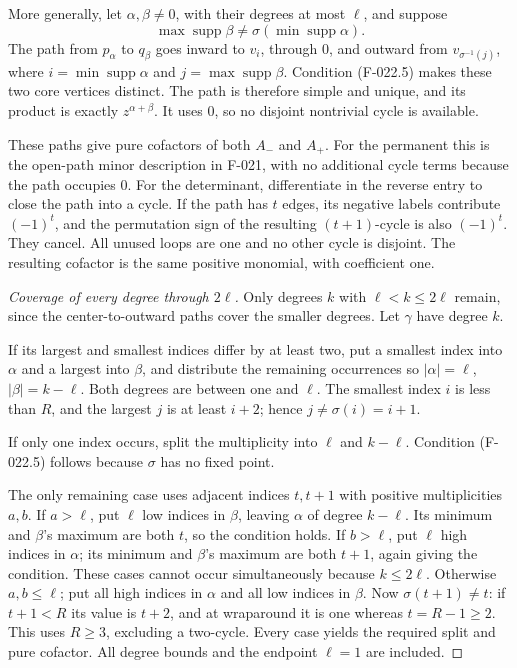More generally, let \(\alpha,\beta\ne0\), with their
degrees at most \(\ell\), and suppose
\[
        \max\operatorname{supp}\beta
                      \ne\sigma(\min\operatorname{supp}\alpha).
                                                               \tag{F-022.5}
\]
The path from \(p_\alpha\) to \(q_\beta\) goes
inward to \(v_i\), through \(0\), and outward from
\(v_{\sigma^{-1}(j)}\), where
\(i=\min\operatorname{supp}\alpha\) and
\(j=\max\operatorname{supp}\beta\).
Condition (F-022.5) makes these two core vertices distinct.
The path is therefore simple and unique, and its product
is exactly \(z^{\alpha+\beta}\). It uses \(0\),
so no disjoint nontrivial cycle is available.

These paths give pure cofactors of both \(A_-\) and
\(A_+\). For the permanent this is the open-path minor
description in F-021, with no additional cycle terms because
the path occupies \(0\). For the determinant, differentiate
in the reverse entry to close the path into a cycle. If
the path has \(t\) edges, its negative labels contribute
\((-1)^t\), and the permutation sign of the resulting
\((t+1)\)-cycle is also \((-1)^t\). They cancel.
All unused loops are one and no other cycle is disjoint.
The resulting cofactor is the same positive monomial,
with coefficient one.

\begin{proof}[Coverage of every degree through \(2\ell\)]
Only degrees \(k\) with \(\ell<k\leq2\ell\) remain,
since the center-to-outward paths cover the smaller degrees.
Let \(\gamma\) have degree \(k\).

If its largest and smallest indices differ by at least two,
put a smallest index into \(\alpha\) and a largest into
\(\beta\), and distribute the remaining occurrences so
\(|\alpha|=\ell\), \(|\beta|=k-\ell\). Both degrees
are between one and \(\ell\). The smallest index \(i\)
is less than \(R\), and the largest \(j\) is at least
\(i+2\); hence \(j\ne\sigma(i)=i+1\).

If only one index occurs, split the multiplicity into
\(\ell\) and \(k-\ell\). Condition (F-022.5) follows
because \(\sigma\) has no fixed point.

The only remaining case uses adjacent indices \(t,t+1\)
with positive multiplicities \(a,b\). If \(a>\ell\),
put \(\ell\) low indices in \(\beta\), leaving
\(\alpha\) of degree \(k-\ell\). Its minimum and
\(\beta\)'s maximum are both \(t\), so the condition
holds. If \(b>\ell\), put \(\ell\) high indices in
\(\alpha\); its minimum and \(\beta\)'s maximum are
both \(t+1\), again giving the condition. These cases
cannot occur simultaneously because \(k\leq2\ell\).
Otherwise \(a,b\leq\ell\); put all high indices in
\(\alpha\) and all low indices in \(\beta\).
Now \(\sigma(t+1)\ne t\): if \(t+1<R\) its value
is \(t+2\), and at wraparound it is one whereas
\(t=R-1\geq2\). This uses \(R\geq3\), excluding a
two-cycle. Every case yields the required split and pure
cofactor. All degree bounds and the endpoint \(\ell=1\)
are included.
\end{proof}

